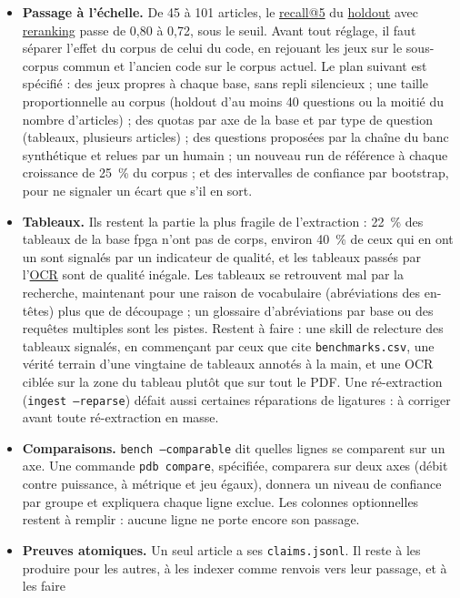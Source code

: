 \documentclass[11pt,a4paper]{article}
\newcommand{\cmd}[1]{\texttt{#1}}
\newcommand{\gl}[2]{\hyperlink{gl:#1}{\textcolor{glcolor}{#2}}}
\begin{document}
\begin{itemize}
  \item \textbf{Passage à l'échelle.} De 45 à 101 articles, le \gl{recall}{recall@5} du \gl{holdout}{holdout} avec
    \gl{reranking}{reranking} passe de 0,80 à 0,72, sous le seuil. Avant tout réglage, il faut séparer
    l'effet du corpus de celui du code, en rejouant les jeux sur le sous-corpus commun et
    l'ancien code sur le corpus actuel. Le plan suivant est spécifié : des jeux propres à
    chaque base, sans repli silencieux ; une taille proportionnelle au corpus (holdout d'au
    moins 40 questions ou la moitié du nombre d'articles) ; des quotas par axe de la base et
    par type de question (tableaux, plusieurs articles) ; des questions proposées par la
    chaîne du banc synthétique et relues par un humain ; un nouveau run de référence à chaque
    croissance de 25~\% du corpus ; et des intervalles de confiance par bootstrap, pour ne
    signaler un écart que s'il en sort.
  \item \textbf{Tableaux.} Ils restent la partie la plus fragile de l'extraction : 22~\% des
    tableaux de la base fpga n'ont pas de corps, environ 40~\% de ceux qui en ont un sont
    signalés par un indicateur de qualité, et les tableaux passés par l'\gl{OCR}{OCR} sont de qualité
    inégale. Les tableaux se retrouvent mal par la recherche, maintenant pour une raison de
    vocabulaire (abréviations des en-têtes) plus que de découpage ; un glossaire
    d'abréviations par base ou des requêtes multiples sont les pistes. Restent à faire : une
    skill de relecture des tableaux signalés, en commençant par ceux que cite
    \cmd{benchmarks.csv}, une vérité terrain d'une vingtaine de tableaux annotés à la main,
    et une OCR ciblée sur la zone du tableau plutôt que sur tout le PDF. Une ré-extraction
    (\cmd{ingest --reparse}) défait aussi certaines réparations de ligatures : à corriger
    avant toute ré-extraction en masse.
  \item \textbf{Comparaisons.} \cmd{bench --comparable} dit quelles lignes se comparent sur un
    axe. Une commande \cmd{pdb compare}, spécifiée, comparera sur deux axes (débit contre
    puissance, à métrique et jeu égaux), donnera un niveau de confiance par groupe et
    expliquera chaque ligne exclue. Les colonnes optionnelles restent à remplir : aucune
    ligne ne porte encore son passage.
  \item \textbf{Preuves atomiques.} Un seul article a ses \cmd{claims.jsonl}. Il reste à les
    produire pour les autres, à les indexer comme renvois vers leur passage, et à les faire

\end{itemize}
\end{document}
